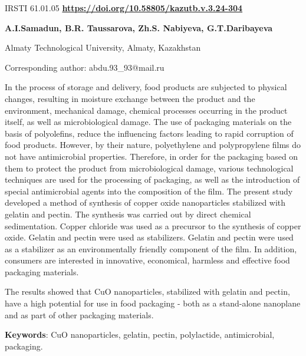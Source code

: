  \newpage
IRSTI 61.01.05
\hfill {\bfseries \href{https://doi.org/10.58805/kazutb.v.3.24-304}{https://doi.org/10.58805/kazutb.v.3.24-304}}


\begin{center}
{\bfseries A.I.Samadun\envelope, B.R. Taussarova, Zh.S. Nabiyeva, G.T.Daribayeva}

Almaty Technological University, Almaty, Kazakhstan
\end{center}
\envelope Corresponding author: abdu.93\_93@mail.ru


In the process of storage and delivery, food products are subjected to
physical changes, resulting in moisture exchange between the product and
the environment, mechanical damage, chemical processes occurring in the
product itself, as well as microbiological damage. The use of packaging
materials on the basis of polyolefins, reduce the influencing factors
leading to rapid corruption of food products. However, by their nature,
polyethylene and polypropylene films do not have antimicrobial
properties. Therefore, in order for the packaging based on them to
protect the product from microbiological damage, various technological
techniques are used for the processing of packaging, as well as the
introduction of special antimicrobial agents into the composition of the
film. The present study developed a method of synthesis of copper oxide
nanoparticles stabilized with gelatin and pectin. The synthesis was
carried out by direct chemical sedimentation. Copper chloride was used
as a precursor to the synthesis of copper oxide. Gelatin and pectin were
used as stabilizers. Gelatin and pectin were used as a stabilizer as an
environmentally friendly component of the film. In addition, consumers
are interested in innovative, economical, harmless and effective food
packaging materials.

The results showed that CuO nanoparticles, stabilized with gelatin and
pectin, have a high potential for use in food packaging - both as a
stand-alone nanoplane and as part of other packaging materials.

{\bfseries Keywords}: CuO nanoparticles, gelatin, pectin, polylactide,
antimicrobial, packaging.


